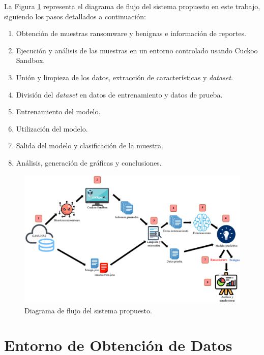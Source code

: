 La Figura \ref{fig:sistema} representa el diagrama de flujo del sistema propuesto en este trabajo, siguiendo los pasos detallados a continuación:
\begin{enumerate}
    \item Obtención de muestras ransomware y benignas e información de reportes.
    \item Ejecución y análisis de las muestras en un entorno controlado usando Cuckoo Sandbox.
    \item Unión y limpieza de los datos, extracción de características y \textit{dataset}.
    \item División del \textit{dataset} en datos de entrenamiento y datos de prueba.
    \item Entrenamiento del modelo.
    \item Utilización del modelo.
    \item Salida del modelo y clasificación de la muestra.
    \item Análisis, generación de gráficas y conclusiones.
\end{enumerate}

\begin{figure}[h!]
\begin{center}
\includegraphics[width=1\linewidth]{images/sistemapropuesto.PNG}
\end{center}
\caption{Diagrama de flujo del sistema propuesto.}
\label{fig:sistema} 
\end{figure}



\section{Entorno de Obtención de Datos} \label{sec:dataset}

